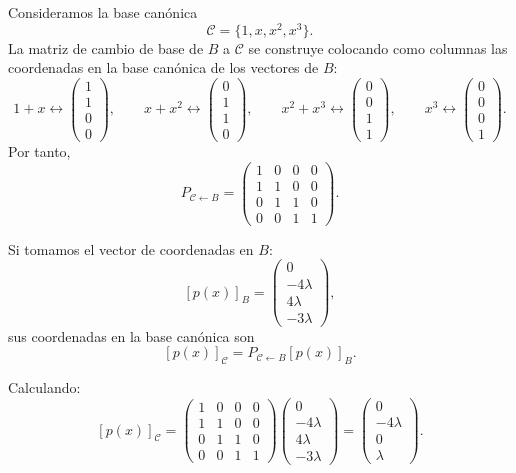 \documentclass[12pt]{article}
\begin{document}
Consideramos la base canónica
\[
\mathcal{C}=\{1,x,x^2,x^3\}.
\]
La matriz de cambio de base de \(B\) a \(\mathcal{C}\) se construye colocando como columnas las coordenadas en la base canónica de los vectores de \(B\):
\[
1+x \leftrightarrow
\begin{pmatrix}
1\\1\\0\\0
\end{pmatrix},
\qquad
x+x^2 \leftrightarrow
\begin{pmatrix}
0\\1\\1\\0
\end{pmatrix},
\qquad
x^2+x^3 \leftrightarrow
\begin{pmatrix}
0\\0\\1\\1
\end{pmatrix},
\qquad
x^3 \leftrightarrow
\begin{pmatrix}
0\\0\\0\\1
\end{pmatrix}.
\]
Por tanto,
\[
P_{\mathcal{C}\leftarrow B}
=
\begin{pmatrix}
1&0&0&0\\
1&1&0&0\\
0&1&1&0\\
0&0&1&1
\end{pmatrix}.
\]

Si tomamos el vector de coordenadas en \(B\):
\[
[p(x)]_B=
\begin{pmatrix}
0\\
-4\lambda\\
4\lambda\\
-3\lambda
\end{pmatrix},
\]
sus coordenadas en la base canónica son
\[
[p(x)]_{\mathcal{C}}
=
P_{\mathcal{C}\leftarrow B}[p(x)]_B.
\]

Calculando:
\[
[p(x)]_{\mathcal{C}}
=
\begin{pmatrix}
1&0&0&0\\
1&1&0&0\\
0&1&1&0\\
0&0&1&1
\end{pmatrix}
\begin{pmatrix}
0\\
-4\lambda\\
4\lambda\\
-3\lambda
\end{pmatrix}
=
\begin{pmatrix}
0\\
-4\lambda\\
0\\
\lambda
\end{pmatrix}.
\]
\end{document}
